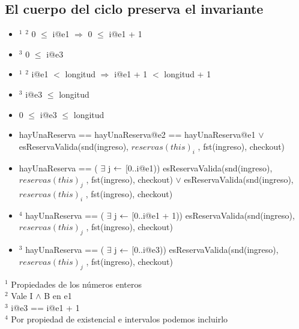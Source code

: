 \subsection{El cuerpo del ciclo preserva el invariante}
\begin{itemize}
	\item $ ^1 $ $ ^2 $ 0 $ \leq $ i@e1 $ \Rightarrow $ 0 $ \leq $ i@e1 + 1
	\item $ ^3 $ 0 $ \leq $ i@e3
	\item $ ^1 $ $^2 $ i@e1 $ < $ longitud $ \Rightarrow $ i@e1 + 1 $ < $ longitud + 1
	\item $ ^3 $ i@e3 $ \leq $ longitud	
	\item \textcolor{NavyBlue}{0 $ \leq $ i@e3 $ \leq $ longitud} \checkmark
	\item hayUnaReserva == hayUnaReserva@e2 == hayUnaReserva@e1 $ \lor $ esReservaValida(snd(ingreso), $ reservas(this)_i $ , fst(ingreso), checkout)
	\item hayUnaReserva == ( $ \exists $ j $ \leftarrow $ [0..i@e1)) esReservaValida(snd(ingreso), $ reservas(this)_j $ , fst(ingreso), checkout) $ \lor $ esReservaValida(snd(ingreso), $ reservas(this)_i $ , fst(ingreso), checkout)
	\item $ ^4 $ hayUnaReserva == ( $ \exists $ j $ \leftarrow $ [0..i@e1 + 1)) esReservaValida(snd(ingreso), $ reservas(this)_j $ , fst(ingreso), checkout)
	\item $ ^3 $ \textcolor{NavyBlue}{hayUnaReserva == ( $ \exists $ j $ \leftarrow $ [0..i@e3)) esReservaValida(snd(ingreso), $ reservas(this)_j $ , fst(ingreso), checkout)} \checkmark
\end{itemize}
\vspace{3mm}

\noindent $ ^1 $ Propiedades de los números enteros\\
$ ^2 $ Vale I $ \land $ B en e1\\
$ ^3 $ i@e3 == i@e1 + 1\\
$ ^4 $ Por propiedad de existencial e intervalos podemos incluirlo\\